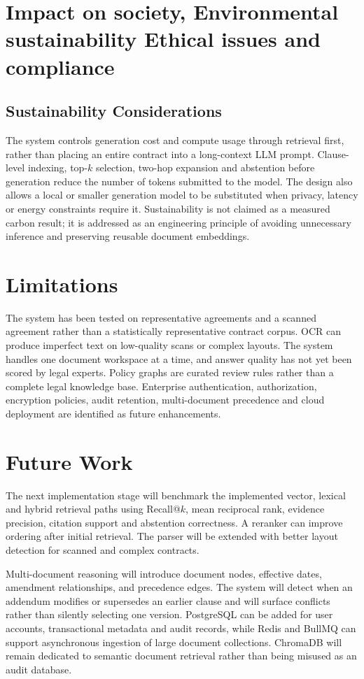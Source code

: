 \documentclass[12pt,a4paper,oneside]{report}
\begin{document}
\section{Impact on society, Environmental sustainability Ethical issues and compliance}
\subsection{Sustainability Considerations}
The system controls generation cost and compute usage through retrieval first, rather than placing an entire contract into a long-context LLM prompt. Clause-level indexing, top-\(k\) selection, two-hop expansion and abstention before generation reduce the number of tokens submitted to the model. The design also allows a local or smaller generation model to be substituted when privacy, latency or energy constraints require it. Sustainability is not claimed as a measured carbon result; it is addressed as an engineering principle of avoiding unnecessary inference and preserving reusable document embeddings.

\section{Limitations}
The system has been tested on representative agreements and a scanned agreement rather than a statistically representative contract corpus. OCR can produce imperfect text on low-quality scans or complex layouts. The system handles one document workspace at a time, and answer quality has not yet been scored by legal experts. Policy graphs are curated review rules rather than a complete legal knowledge base. Enterprise authentication, authorization, encryption policies, audit retention, multi-document precedence and cloud deployment are identified as future enhancements.

\section{Future Work}
The next implementation stage will benchmark the implemented vector, lexical and hybrid retrieval paths using Recall@\(k\), mean reciprocal rank, evidence precision, citation support and abstention correctness. A reranker can improve ordering after initial retrieval. The parser will be extended with better layout detection for scanned and complex contracts.

Multi-document reasoning will introduce document nodes, effective dates, amendment relationships, and precedence edges. The system will detect when an addendum modifies or supersedes an earlier clause and will surface conflicts rather than silently selecting one version. PostgreSQL can be added for user accounts, transactional metadata and audit records, while Redis and BullMQ can support asynchronous ingestion of large document collections. ChromaDB will remain dedicated to semantic document retrieval rather than being misused as an audit database.
\end{document}
